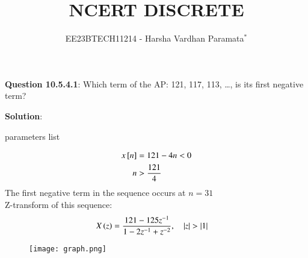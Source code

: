 \documentclass[journal,12pt,twocolumn]{IEEEtran}
\theoremstyle{remark}
\begin{document}

\vspace{3cm}

\title{NCERT DISCRETE}
\author{EE23BTECH11214 - Harsha Vardhan Paramata$^{*}$%
}
\maketitle
\newpage
\bigskip

\renewcommand{\thefigure}{\theenumi}
\renewcommand{\thetable}{\theenumi}

\textbf{Question 10.5.4.1}:
Which term of the AP: 121, 117, 113, \ldots, is its first negative term?

\textbf{Solution}:
\begin{table}[htbp]
\centering

\caption{parameters list}
\end{table}

\begin{align}
x{}\left[n\right] &= 121 - 4n < 0 \\
n &> \frac{121}{4} 
\end{align}
The first negative term in the sequence occurs at 
$n = 31$  \\
Z-transform of this sequence:
\begin{align}
    X\left(z\right) &= \frac{121 - 125z^{-1}}{1 - 2z^{-1} + z^{-2}}
 ,\quad \left\vert z\right\vert > \left\vert1\right\vert
\end{align}
\begin{figure}[!ht] 
\centering
\texttt{[image: graph.png]}
\end{figure}
\end{document}
